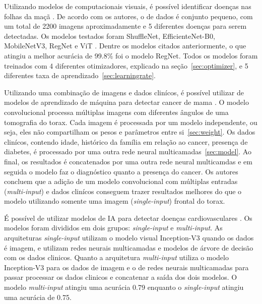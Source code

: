 \documentclass[ %
	msc, %
	portugues %
]{../ppgccufmg}
\begin{document}
    Utilizando modelos de computacionais visuais, é possível identificar
    doenças nas folhas da maçã \citep{Li2021-vk}. De acordo com os autores, o de dados é conjunto
    pequeno, com um total de  2200 imagens aproximadamente e 5 diferentes doenças para serem
    detectadas. Os modelos testados foram ShuffleNet, EfficienteNet-B0, MobileNetV3, RegNet e ViT
    \citep{DBLP:journals/corr/ZhangZLS17, efficientnet, https://doi.org/10.48550/arxiv.2101.00590,
    DBLP:journals/corr/HowardZCKWWAA17, DBLP:journals/corr/abs-1807-10165}. Dentre os modelos
    citados anteriormente, o que atingiu a melhor acurácia de 99.8\% foi o modelo RegNet.
    Todos os modelos foram treinados com 4 diferentes otimizadores, explicado na seção~\ref{sec:optimizer},
    e 5 diferentes taxa de aprendizado~\ref{sec:learningrate}.

    Utilizando uma combinação de imagens e dados clinícos, é possível utilizar de modelos de
    aprendizado de máquina para detectar cancer de mama \citep{SANCHEZCAUCE2021106045}.
    O modelo convolucional processa múltiplas imagens com diferentes ângulos de uma tomografia do torax. Cada
    imagem é processada por um modelo independente, ou seja, eles não compartilham os pesos
    e parâmetros entre si~\ref{sec:weight}. Os dados clinícos, contendo idade, histórico da família
    em relação ao cancer, presença de diabetes, é processado por uma outra rede neural multicamadas~\ref{sec:model}.
    Ao final, os resultados é concatenados por uma outra rede neural multicamdas e
    em seguida o modelo faz o diagnóstico quanto a presença do cancer. Os autores concluem
    que a adição de um modelo convolucional com múltiplas entradas (\textit{multi-input}) e dados
    clinícos conseguem trazer resultados melhores do que o modelo utilizando somente uma
    imagem (\textit{single-input}) frontal do torax.

    É possível de utilizar modelos de IA para detectar doenças cardiovasculares
    \citep{APOSTOLOPOULOS2021168}. Os modelos foram divididos em dois grupos:
    \textit{single-input} e \textit{multi-input}. As arquiteturas \textit{single-input} utilizam o
    modelo visual Inception-V3 \citep{DBLP:journals/corr/SzegedyVISW15} quando os dados é imagem, e
    utilizam redes neurais multicamadas e modelos de árvore de decisão \citep{Breiman2001} com os dados clinicos.
    Quanto a arquitetura \textit{multi-input} utiliza o modelo Inception-V3 para os dados de imagem
    e o  de redes neurais multicamadas para passar processar os dados clinicos e concatenar a saída
    dos dois modelos. O modelo \textit{multi-input} atingiu uma acurácia 0.79 enquanto o
    \textit{single-input} atingiu uma acurácia de 0.75.
\end{document}
